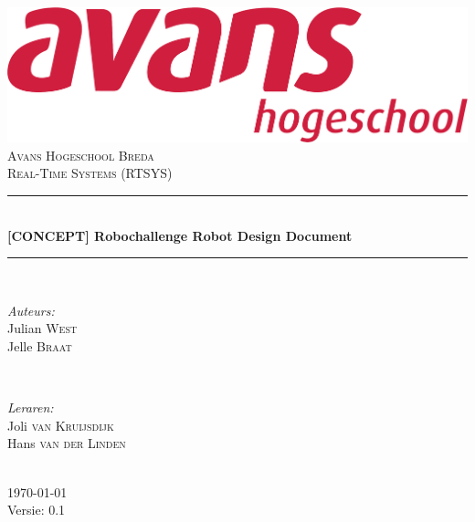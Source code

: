 \documentclass[12pt]{article} %
\begin{document}
\begin{titlepage}
\newcommand{\HRule}{\rule{\linewidth}{0.5mm}} %

\center %
\includegraphics[scale=.1,keepaspectratio]{avans.pdf} \\
\textsc{\Large Avans Hogeschool Breda}\\[0.5cm] %
\textsc{\large Real-Time Systems (RTSYS)}\\[0.5cm] %
\HRule \\[0.4cm]
{ \huge \bfseries \textbf{[CONCEPT]} Robochallenge Robot Design Document}\\[0.4cm] %
\HRule \\[1.5cm]

\begin{minipage}{0.4\textwidth}
\begin{flushleft} \large
\emph{Auteurs:}\\
Julian \textsc{West} \\
Jelle \textsc{Braat} \\
\end{flushleft}
\end{minipage}
~
\begin{minipage}{0.4\textwidth}
\begin{flushright} \large
\emph{Leraren:} \\
Joli \textsc{van Kruijsdijk} \\ %
Hans \textsc{van der Linden} \\
\end{flushright}
\end{minipage}\\[4cm]

{\large \today}\\[3cm] %
Versie: 0.1
\vfill %

\end{titlepage}
\end{document}
